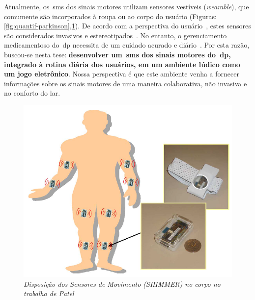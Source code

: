 
Atualmente, os~\ac{sms} dos sinais motores utilizam sensores vestíveis (\textit{wearable}), que comumente são incorporados à roupa ou ao corpo do usuário (Figuras: \ref{fig:quantif-parkinson},\ref{fig:patel-shimmer}). De acordo com a perspectiva do usuário~\cite{aarhus_negotiating_2010}, estes sensores são considerados invasivos e estereotipados~\cite{aarhus_negotiating_2010}. No entanto, o gerenciamento medicamentoso do~\ac{dp} necessita de um cuidado acurado e diário~\cite{quantitativeparkinson2011}. Por esta razão, buscou-se nesta tese: \textbf{desenvolver um~\ac{sms} dos sinais motores do~\ac{dp}, integrado à rotina diária dos usuários, em um ambiente lúdico como um jogo eletrônico}. Nossa perspectiva é que este ambiente venha a fornecer informações sobre os sinais motores de uma maneira colaborativa, não invasiva e no conforto do lar. 

\begin{figure}
 \centering
 \includegraphics[scale=0.3]{./img/patel-shimmer.png}
\caption[Disposição dos Sensores de Movimento (SHIMMER) no corpo no trabalho de Patel]{\textit{Disposição dos Sensores de Movimento (SHIMMER) no corpo no trabalho de Patel ~\cite{patel_monitoring_2009}}}
 \label{fig:patel-shimmer}
\end{figure}

